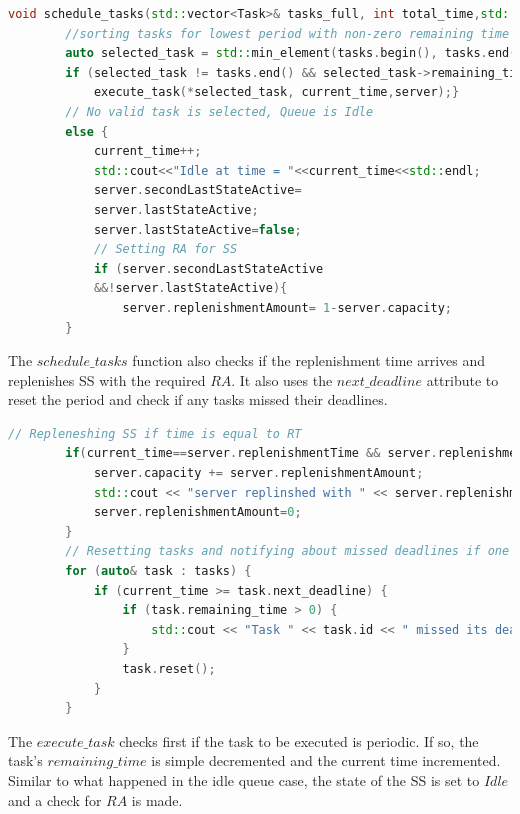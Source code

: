 \documentclass[conference]{IEEEtran}
\begin{document}
\begin{lstlisting}[language=C++]
void schedule_tasks(std::vector<Task>& tasks_full, int total_time,std::vector<Task>& tasks,SporadicServer& server) {
        //sorting tasks for lowest period with non-zero remaining time
        auto selected_task = std::min_element(tasks.begin(), tasks.end(),comparater);
        if (selected_task != tasks.end() && selected_task->remaining_time > 0) {
            execute_task(*selected_task, current_time,server);}
        // No valid task is selected, Queue is Idle
        else {
            current_time++;
            std::cout<<"Idle at time = "<<current_time<<std::endl;
            server.secondLastStateActive=
            server.lastStateActive;
            server.lastStateActive=false;
            // Setting RA for SS
            if (server.secondLastStateActive
            &&!server.lastStateActive){
                server.replenishmentAmount= 1-server.capacity;
        }
\end{lstlisting}
The $schedule\_tasks$ function also checks if the replenishment time arrives and replenishes SS with the required $RA$. It also uses the $next\_deadline$ attribute to reset the period and check if any tasks missed their deadlines.
\begin{lstlisting}[language=C++]
        // Repleneshing SS if time is equal to RT
        if(current_time==server.replenishmentTime && server.replenishmentAmount){
            server.capacity += server.replenishmentAmount;
            std::cout << "server replinshed with " << server.replenishmentAmount << " at time " << current_time << "\n";
            server.replenishmentAmount=0;
        }
        // Resetting tasks and notifying about missed deadlines if one happens
        for (auto& task : tasks) {
            if (current_time >= task.next_deadline) {
                if (task.remaining_time > 0) {
                    std::cout << "Task " << task.id << " missed its deadline at time " << current_time << "\n";
                }
                task.reset();
            }
        }
\end{lstlisting}
The \textit{$execute\_task$} checks first if the task to be executed is periodic. If so, the task's  \textit{$remaining\_time$} is simple decremented and the current time incremented. Similar to what happened in the idle queue case, the state of the SS is set to $Idle$ and a check for $RA$ is made.
\end{document}
